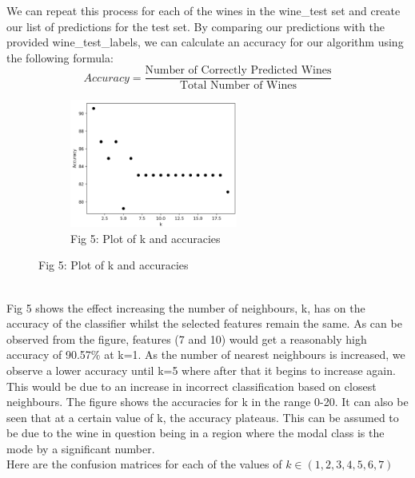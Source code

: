 \documentclass[11pt]{article}
\begin{document}
\noindent
We can repeat this process for each of the wines in the wine\_test set and create our list of predictions for the test set. By comparing our predictions with the provided wine\_test\_labels, we can calculate an accuracy for our algorithm using the following formula:
$$Accuracy = \frac{\text{Number of Correctly Predicted Wines}}{\text{Total Number of Wines}}$$
\begin{figure}[h!]
\captionsetup[subfigure]{labelformat=empty}
\begin{subfigure}{\textwidth}
\captionsetup[figure]{labelformat=empty}
\centering
\includegraphics[height=4.2cm]{accuracies.png}
\caption{Fig 5: Plot of k and accuracies}
\end{subfigure}%
\end{figure}
\\
\noindent
Fig 5 shows the effect increasing the number of neighbours, k, has on the accuracy of the classifier whilst the selected features remain the same. As can be observed from the figure, features (7 and 10) would get a reasonably high accuracy of 90.57\% at k=1. As the number of nearest neighbours is increased, we observe a lower accuracy until k=5 where after that it begins to increase again. This would be due to an increase in incorrect classification based on closest neighbours. The figure shows the accuracies for k in the range 0-20. It can also be seen that at a certain value of k, the accuracy plateaus. This can be assumed to be due to the wine in question being in a region where the modal class is the mode by a significant number.\\

\noindent
Here are the confusion matrices for each of the values of $k \in (1,2,3,4,5,6,7)$
\end{document}
